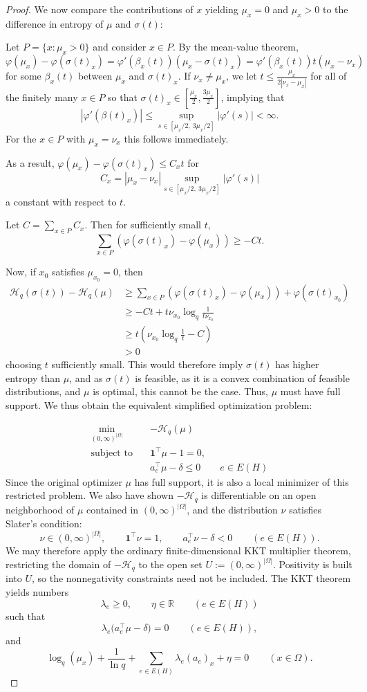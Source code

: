 \documentclass[10pt,a4paper]{amsart}
\begin{document}
\begin{proof}
We now compare the contributions of $x$ yielding $\mu_x=0$ and $\mu_x>0$ to the difference in entropy of $\mu$ and $\sigma(t)$:

Let $P=\{x:\mu_x>0\}$ and consider $x\in P$. By the mean-value theorem,
\[
\varphi(\mu_x)-\varphi(\sigma(t)_x)=\varphi'(\beta_x(t))(\mu_x-\sigma(t)_x)=\varphi'(\beta_x(t))t(\mu_x-\nu_x)
\] 
for some $\beta_x(t)$ between $\mu_x$ and $\sigma(t)_x$. If $\nu_x\not=\mu_x$, we  let $t\leq\frac{\mu_x}{2|\nu_x-\mu_x|}$ for all of the finitely many $x\in P$ so that $\sigma(t)_x\in[\frac{\mu_x}2,\frac{3\mu_x}2]$, implying that
\[
|\varphi'(\beta(t)_x)|\leq\sup_{s\in[{\mu_x/}2,\ 3\mu_x/2]}\left|\varphi'(s)\right|<\infty.
\]
For the $x\in P$ with $\mu_x=\nu_x$ this follows immediately.

As a result, $\varphi(\mu_x)-\varphi(\sigma(t)_x)\leq C_xt$ for 
\[
C_x=|\mu_x-\nu_x|\sup_{s\in[{\mu_x/}2,\ 3\mu_x/2]}\left|\varphi'(s)\right|
\]
a constant with respect to $t$. 

Let $C=\sum_{x\in P}C_x$. Then for sufficiently small $t$,
\[
\sum_{x\in P}(\varphi(\sigma(t)_x)-\varphi(\mu_x))\geq-Ct.
\]

Now, if $x_0$ satisfies $\mu_{x_0}=0$, then
\begin{align*}
    \mathcal H_q(\sigma(t))-\mathcal H_q(\mu)&\geq\sum_{x\in P}\left(\varphi(\sigma(t)_x)-\varphi(\mu_x)\right)+\varphi(\sigma(t)_{x_0})\\
    &\geq-Ct+t\nu_{x_0}\log_q\frac{1}{t\nu_{x_0}}\\
    &\geq t(\nu_{x_0}\log_q\frac{1}{t}-C)\\
    &>0
\end{align*}
choosing $t$ sufficiently small.
This would therefore imply $\sigma(t)$ has higher entropy than $\mu$, and as $\sigma(t)$ is feasible, as it is a convex combination of feasible distributions, and $\mu$ is optimal, this cannot be the case. Thus, $\mu$ must have full support. We thus obtain the equivalent simplified optimization problem:

\[
\begin{aligned}
\min_{(0,\infty)^{|\Omega|}}\quad & -\mathcal{H}_q(\mu)\\
\text{subject to}\quad
&\mathbf1^\top\mu-1=0,\\
&a_{e}^\top\mu-\delta\leq0\qquad e\in E(H)
\end{aligned}
\]
Since the original optimizer \(\mu\) has full support, it is also a
local minimizer of this restricted problem. We also have shown $-\mathcal H_q$ is differentiable on an open neighborhood of $\mu$ contained in $(0,\infty)^{|\Omega|}$, and the distribution $\nu$ satisfies Slater's condition:
\[
\nu\in(0,\infty)^{|\Omega|},\qquad\mathbf1^\top\nu=1,\qquad a_e^\top\nu-\delta<0\qquad(e\in E(H)).
\]
We may therefore apply the ordinary finite-dimensional KKT multiplier
theorem, restricting the domain of $-\mathcal H_q$ to the open set $U:=(0,\infty)^{|\Omega|}$. Positivity is built into $U$, so the nonnegativity constraints need not be included. The KKT theorem yields numbers
\[
\lambda_e\geq0,\qquad\eta\in\mathbb R\qquad(e\in E(H))
\]
such that
\[
\lambda_e\bigl(a_e^\top\mu-\delta)=0\qquad (e\in E(H)),
\]
and
\[
\log_q(\mu_x)+\frac{1}{\ln q}+\sum_{e\in E(H)}\lambda_e(a_e)_x+\eta=0\qquad (x\in\Omega).
\]


\end{proof}
\end{document}
